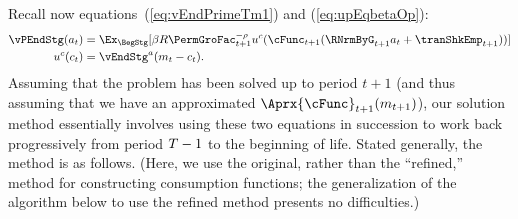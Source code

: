 \documentclass[SolvingMicroDSOPs]{subfiles}
\begin{document}
Recall now equations~(\ref{eq:vEndPrimeTm1}) and (\ref{eq:upEqbetaOp}):
\begin{equation*}\begin{gathered}\begin{aligned}
      \vPEndStg(a_{\prd})  & = \Ex_{\BegStg}[\DiscFac \Rfree \PermGroFac_{\prd+1}^{-\CRRA}
      \uFunc^{c}(\cFunc_{\prd+1}(\RNrmByG_{\prd+1} a_{\prd}+{\tranShkEmp}_{\prd+1}))]
      \\\uFunc^{c}(c_{\prd})   & = \vEndStg^{a}(m_{\prd}-c_{\prd}).
    \end{aligned}\end{gathered}\end{equation*}
Assuming that the problem has been solved up to period $t+1$ (and thus assuming that we have an approximated $\Aprx{\cFunc}_{\prd+1}(m_{\prd+1})$), our solution method essentially involves using these two equations in succession to work back progressively from period $T-1$ to the beginning of life.  Stated generally, the method is as follows.  (Here, we use the original, rather than the ``refined,'' method for constructing consumption functions; the generalization of the algorithm below to use the refined method presents no difficulties.)
\end{document}
